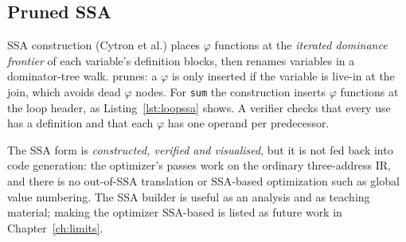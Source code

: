 \subsection{Pruned SSA}
SSA construction (Cytron et al.) places $\varphi$ functions at the \emph{iterated dominance frontier} of each variable's definition blocks, then renames variables in a dominator-tree walk. \nova{} prunes: a $\varphi$ is only inserted if the variable is live-in at the join, which avoids dead $\varphi$ nodes. For \texttt{sum} the construction inserts \LoopPhis{} $\varphi$ functions at the loop header, as Listing~\ref{lst:loopssa} shows. A verifier checks that every use has a definition and that each $\varphi$ has one operand per predecessor.

\begin{figure}[H]\centering\begin{minipage}{0.75\textwidth}
\begingroup{}\endgroup
\end{minipage}\end{figure}

\begin{warnbox}
The SSA form is \emph{constructed, verified and visualised}, but it is not fed back into code generation: the optimizer's passes work on the ordinary three-address IR, and there is no out-of-SSA translation or SSA-based optimization such as global value numbering. The SSA builder is useful as an analysis and as teaching material; making the optimizer SSA-based is listed as future work in Chapter~\ref{ch:limits}.
\end{warnbox}

